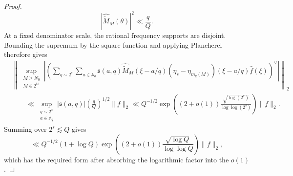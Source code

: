 \documentclass[12pt,reqno]{amsart}
\numberwithin{equation}{section}
\theoremstyle{definition}
\theoremstyle{remark}
\begin{document}
\begin{proof}
\[ |\widehat{\widetilde M}_M(\theta)|^2
 \ll\frac qQ.
\]
At a fixed denominator scale, the rational frequency supports are
disjoint.  Bounding the supremum by the square function and applying
Plancherel therefore gives
\begin{align*}
 &\left\|
 \sup_{\substack{M\geq N_0\\M\in2^{\mathbb N}}}
 \left|
 \left(
 \sum_{q\sim2^s}\sum_{a\in\mathbb A_q}
 \mathfrak s(a,q)\widehat{\widetilde M}_M(\xi-a/q)
 (\eta_s-\eta_{m_q(M)})(\xi-a/q)\widehat f(\xi)
 \right)^\vee
 \right|
 \right\|_2\\
 &\qquad\ll
 \sup_{\substack{q\sim2^s\\a\in\mathbb A_q}}
 |\mathfrak s(a,q)|
 \left(\frac qQ\right)^{1/2}\|f\|_2\ll
 Q^{-1/2}
 \exp\left(
 (2+o(1))\frac{\sqrt{\log(2^s)}}{\log\log(2^s)}
 \right)\|f\|_2.
\end{align*}
Summing over \(2^s\lesssim Q\) gives
\[
 \ll
 Q^{-1/2}(1+\log Q)
 \exp\left(
 (2+o(1))\frac{\sqrt{\log Q}}{\log\log Q}
 \right)\|f\|_2,
\]
which has the required form after absorbing the logarithmic factor into
the \(o(1)\).


\end{proof}
\end{document}
